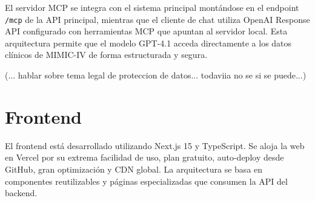 El servidor MCP se integra con el sistema principal montándose en el endpoint \texttt{/mcp} de la API principal, mientras que el cliente de chat utiliza OpenAI Response API configurado con herramientas MCP que apuntan al servidor local. Esta arquitectura permite que el modelo GPT-4.1 acceda directamente a los datos clínicos de MIMIC-IV de forma estructurada y segura.








(... hablar sobre tema legal de proteccion de datos... todaviia no se si se puede...)


\newpage
\section{Frontend}

El frontend está desarrollado utilizando Next.js 15 y TypeScript. Se aloja la web en Vercel por su extrema facilidad de uso, plan gratuito, auto-deploy desde GitHub, gran optimización y CDN global. La arquitectura se basa en componentes reutilizables y páginas especializadas que consumen la API del backend.

